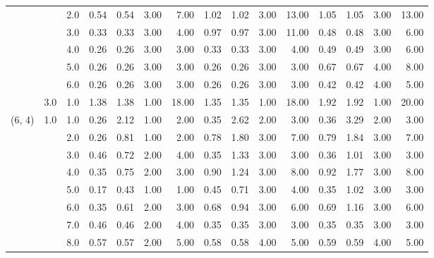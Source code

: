 \begin{tabular}{lllrrrrrrrrrrrr}
       &     & 2.0  &       0.54 &      0.54 & 3.00 &   7.00 &       1.02 &      1.02 &  3.00 &  13.00 &       1.05 &      1.05 &  3.00 &  13.00 \\
       &     & 3.0  &       0.33 &      0.33 & 3.00 &   4.00 &       0.97 &      0.97 &  3.00 &  11.00 &       0.48 &      0.48 &  3.00 &   6.00 \\
       &     & 4.0  &       0.26 &      0.26 & 3.00 &   3.00 &       0.33 &      0.33 &  3.00 &   4.00 &       0.49 &      0.49 &  3.00 &   6.00 \\
       &     & 5.0  &       0.26 &      0.26 & 3.00 &   3.00 &       0.26 &      0.26 &  3.00 &   3.00 &       0.67 &      0.67 &  4.00 &   8.00 \\
       &     & 6.0  &       0.26 &      0.26 & 3.00 &   3.00 &       0.26 &      0.26 &  3.00 &   3.00 &       0.42 &      0.42 &  4.00 &   5.00 \\
       & 3.0 & 1.0  &       1.38 &      1.38 & 1.00 &  18.00 &       1.35 &      1.35 &  1.00 &  18.00 &       1.92 &      1.92 &  1.00 &  20.00 \\
(6, 4) & 1.0 & 1.0  &       0.26 &      2.12 & 1.00 &   2.00 &       0.35 &      2.62 &  2.00 &   3.00 &       0.36 &      3.29 &  2.00 &   3.00 \\
       &     & 2.0  &       0.26 &      0.81 & 1.00 &   2.00 &       0.78 &      1.80 &  3.00 &   7.00 &       0.79 &      1.84 &  3.00 &   7.00 \\
       &     & 3.0  &       0.46 &      0.72 & 2.00 &   4.00 &       0.35 &      1.33 &  3.00 &   3.00 &       0.36 &      1.01 &  3.00 &   3.00 \\
       &     & 4.0  &       0.35 &      0.75 & 2.00 &   3.00 &       0.90 &      1.24 &  3.00 &   8.00 &       0.92 &      1.77 &  3.00 &   8.00 \\
       &     & 5.0  &       0.17 &      0.43 & 1.00 &   1.00 &       0.45 &      0.71 &  3.00 &   4.00 &       0.35 &      1.02 &  3.00 &   3.00 \\
       &     & 6.0  &       0.35 &      0.61 & 2.00 &   3.00 &       0.68 &      0.94 &  3.00 &   6.00 &       0.69 &      1.16 &  3.00 &   6.00 \\
       &     & 7.0  &       0.46 &      0.46 & 2.00 &   4.00 &       0.35 &      0.35 &  3.00 &   3.00 &       0.35 &      0.35 &  3.00 &   3.00 \\
       &     & 8.0  &       0.57 &      0.57 & 2.00 &   5.00 &       0.58 &      0.58 &  4.00 &   5.00 &       0.59 &      0.59 &  4.00 &   5.00 \\

\end{tabular}
